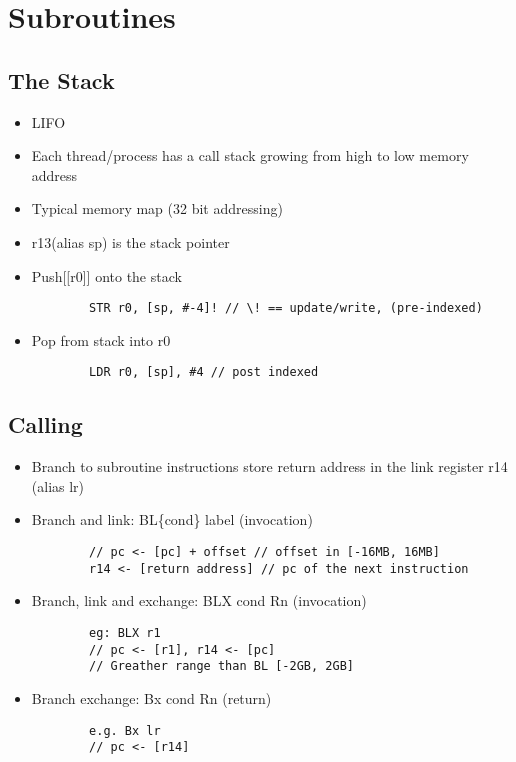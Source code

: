 \documentclass[12pt]{report}
\begin{document}
\section{Subroutines}
  \subsection{The Stack}
    \begin{itemize}
      \item LIFO
      \item Each thread/process has a call stack growing from high to low
      memory address
      \item Typical memory map (32 bit addressing)
      \item r13(alias sp) is the stack pointer
      \item Push[[r0]] onto the stack
      \begin{lstlisting}
        STR r0, [sp, #-4]! // \! == update/write, (pre-indexed)
      \end{lstlisting}
      \item Pop from stack into r0
      \begin{lstlisting}
        LDR r0, [sp], #4 // post indexed
      \end{lstlisting}
    \end{itemize}

  \subsection{Calling}
    \begin{itemize}
      \item Branch to subroutine instructions store return address in the link
      register r14 (alias lr)
      \item Branch and link: BL\{cond\} label (invocation)
      \begin{lstlisting}
        // pc <- [pc] + offset // offset in [-16MB, 16MB]
        r14 <- [return address] // pc of the next instruction
      \end{lstlisting}
      \item Branch, link and exchange: BLX {cond} Rn (invocation)
      \begin{lstlisting}
        eg: BLX r1
        // pc <- [r1], r14 <- [pc]
        // Greather range than BL [-2GB, 2GB]
      \end{lstlisting}
    \item Branch exchange: Bx {cond} Rn (return)
      \begin{lstlisting}
        e.g. Bx lr
        // pc <- [r14]
      \end{lstlisting}
    \end{itemize}
\end{document}
